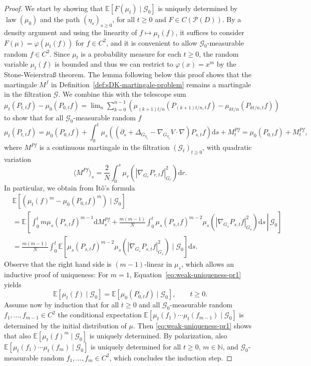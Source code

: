 \documentclass[11pt, a4paper]{article}
\newcommand{\cdummy}{\cdot}
\newcommand{\mathd}{\mathrm{d}}
\newcommand{\tmop}[1]{\ensuremath{\operatorname{#1}}}
\begin{document}
\begin{proof}
    We start by showing that $\mathbb{E} [F (\mu_t) \mid \mathcal{G}_0]$ is uniquely
determined by $\tmop{law} (\mu_0)$ and the path $(\eta_s)_{s \geq 0}$,
for all $t \geq 0$ and $F \in C (\mathcal{P} (D))$. By a density
argument and using the linearity of $f \mapsto \mu_t (f)$, it suffices to
consider $F (\mu) = \varphi (\mu_t (f))$ for $f \in C^2$, and it is
convenient to allow $\mathcal{G}_0$-measurable random $f \in C^2$. Since
$\mu_t$ is a probability measure for each $t \geq 0$, the random variable
$\mu_t (f)$ is bounded and thus we can restrict to $\varphi (x) = x^m$ by the
Stone-Weierstra{\ss} theorem. The lemma following below this proof shows that the martingale $M^f$ in Definition~\ref{def:sDK-martingale-problem} remains a martingale in the filtration $\mathcal G$. We combine this with the telescope sum $\mu_t (P_{t, t} f) - \mu_0 (P_{0, t} f) = \lim_n \sum_{k=0}^{n-1}(\mu_{(k+1)t/n} (P_{(k+1)t/n, t} f) - \mu_{kt/n} (P_{kt/n, t} f))$ to show that for all
$\mathcal{G}_0$-measurable random $f$
\[ \mu_t (P_{t, t} f) = \mu_0 (P_{0, t} f) + \int_0^t \mu_s \left(  \left(
   \partial_s + \Delta_{G_{\eta_s}} - \nabla_{G_{\eta_s}} V \cdummy \nabla
   \right) P_{s, t} f \right) \mathd s + M^{P f}_t = \mu_0 (P_{0, t} f) + M^{P
   f}_t, \]
where $M^{P f}$ is a continuous martingale in the filtration
$(\mathcal{G}_t)_{t \geq 0}$, with quadratic variation
\[ \langle M^{P f} \rangle_s = \frac{2}{N} \int_0^s \mu_r (| \nabla_{G_r}
   P_{r, t} f |^2_{G_r}) \mathd r. \]
In particular, we obtain from It{\^o}'s formula
\begin{align} \nonumber
  & \mathbb{E} [(\mu_t (f)^m - \mu_0 (P_{0, t} f)^m) \mid \mathcal{G}_0]\\  \nonumber
  & =\mathbb{E} \left[ \left. \int_0^t m \mu_s (P_{s, t} f)^{m - 1} \mathd
  M^{P f}_s + \frac{m (m - 1)}{N} \int_0^t \mu_s (P_{s, t} f)^{m - 2} \mu_s (|
  \nabla_{G_s} P_{s, t} f |^2_{G_s}) \mathd s \,\right|\, \mathcal{G}_0 \right]\\ \label{eq:weak-uniqueness-pr1}
  & = \frac{m (m - 1)}{N} \int_0^t \mathbb{E} [\mu_s (P_{s, t} f)^{m - 2}
  \mu_s (| \nabla_{G_s} P_{s, t} f |^2_{G_s}) \mid \mathcal{G}_0] \mathd s.
\end{align}
Observe that the right hand side is $(m - 1)$-linear in $\mu_s$, which allows
an inductive proof of uniqueness: For $m = 1$, Equation~\eqref{eq:weak-uniqueness-pr1} yields
\[ \mathbb{E} [\mu_t (f) \mid \mathcal{G}_0] =\mathbb{E} [\mu_0 (P_{0, t} f)
   \mid \mathcal{G}_0], \qquad t \geq 0. \]
Assume now by induction that for all $t \geq 0$ and all
$\mathcal{G}_0$-measurable random $f_1, \ldots, f_{m - 1} \in C^2$ the
conditional expectation $\mathbb{E} [\mu_t (f_1) \cdots \mu_t (f_{m - 1})
\mid\mathcal{G}_0]$ is determined by the initial distribution of $\mu$. Then \eqref{eq:weak-uniqueness-pr1} shows that also $\mathbb{E} [\mu_t (f)^m
\mid\mathcal{G}_0]$ is uniquely determined. By
polarization, also $\mathbb{E} [\mu_t (f_1) \cdots \mu_t (f_m)
\mid\mathcal{G}_0]$ is uniquely determined for all $t \geq 0$, $m \in
\mathbb{N}$, and $\mathcal{G}_0$-measurable random $f_1, \ldots, f_m \in C^2$, which concludes the induction step.


\end{proof}
\end{document}
